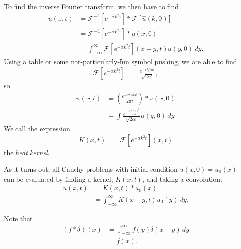 \documentclass[10pt]{mypackage}
\begin{document}
\begin{example}
  To find the inverse Fourier transform, we then have to find
  \begin{align*}
    u\left( x,t \right) &= \mathcal{F}^{-1}\left[ e^{-\alpha k^2 t} \right] \ast \mathcal{F}\left[ \hat{u}\left( k,0 \right) \right]\\
                        &= \mathcal{F}^{-1}\left[ e^{-\alpha k^2 t} \right]\ast u\left( x,0 \right)\\
                        &= \int_{-\infty}^{\infty} \mathcal{F}\left[ e^{-\alpha k^2 t} \right]\left( x-y,t \right)u\left( y,0 \right)\:dy.
  \end{align*}
  Using a table or some not-particularly-fun symbol pushing, we are able to find
  \begin{align*}
    \mathcal{F}\left[ e^{-\alpha k^2 t} \right] &= \frac{e^{-x^2/4\alpha t}}{\sqrt{2\alpha t}},
  \end{align*}
  so
  \begin{align*}
    u\left( x,t \right) &= \left( \frac{e^{-x^2/4\alpha t}}{2\pi t} \right)\ast u\left( x,0 \right)\\
                        &= \int_{}^{} \frac{e^{-\frac{\left( x-y \right)^2}{4\alpha t}}}{\sqrt{2\alpha t}}u\left( y,0 \right)\:dy
  \end{align*}
  We call the expression
  \begin{align*}
    K\left( x,t \right) &= \mathcal{F}\left[ e^{-\alpha k^2 t} \right]\left( x,t \right)
  \end{align*}
  the \textit{heat kernel}.\newline

  As it turns out, all Cauchy problems with initial condition $u\left( x,0 \right) = u_0\left( x \right)$ can be evaluated by finding a kernel, $K\left( x,t \right)$, and taking a convolution:
  \begin{align*}
    u\left( x,t \right) &= K\left( x,t \right)\ast u_0\left( x \right)\\
                        &= \int_{-\infty}^{\infty} K\left( x-y,t \right)u_0\left( y \right)\:dy.
  \end{align*}
\end{example}
\begin{example}
  Note that
  \begin{align*}
    \left( f\ast \delta \right)\left( x \right) &= \int_{-\infty}^{\infty} f(y)\delta\left( x-y \right)\:dy\\
                                                &= f(x).
  \end{align*}
\end{example}
\end{document}
